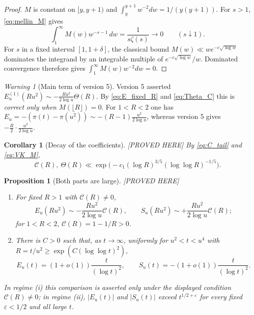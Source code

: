 \documentclass[11pt]{amsart}
\numberwithin{equation}{section}
\theoremstyle{plain}
\newtheorem{proposition}[theorem]{Proposition}
\newtheorem{corollary}[theorem]{Corollary}
\theoremstyle{definition}
\theoremstyle{remark}
\newtheorem{warning}[theorem]{Warning}
\newcommand{\eps}{\varepsilon}
\newcommand{\Cc}{\mathcal{C}}
\begin{document}
\begin{proof}
$M$ is constant on $[y,y+1)$ and $\int_y^{y+1}w^{-2}dw=1/(y(y+1))$. For $s>1$, \eqref{eq:mellin_M} gives
\[
\int_1^\infty M(w)w^{-s-1}\,dw=\frac1{s\zeta(s)}\longrightarrow0
\qquad(s\downarrow1).
\]
For $s$ in a fixed interval $[1,1+\delta]$, the classical bound
$M(w)\ll we^{-c\sqrt{\log w}}$ dominates the integrand by an integrable
multiple of $e^{-c\sqrt{\log w}}/w$.  Dominated convergence therefore gives
$\int_1^\infty M(w)w^{-2}dw=0$.
\end{proof}

\begin{warning}[Main term of version 5]
\label{warn:v5_main_term}
Version 5 asserted $E_u^{(1)}(Ru^2)\sim-\frac{Ru^2}{2\log u}\Theta(R)$. By
\eqref{eq:E_fixed_R} and \eqref{eq:Theta_C} this is \emph{correct only when
$M(\lfloor R\rfloor)=0$}. For $1<R<2$ one has
$E_u=-(\pi(t)-\pi(u^2))\sim-(R-1)\frac{u^2}{2\log u}$, whereas version 5
gives $-\frac R2\cdot\frac{u^2}{2\log u}$.
\end{warning}

\begin{corollary}[Decay of the coefficients]
\label{cor:AR-VK}
\emph{[PROVED HERE]} By \eqref{eq:C_tail} and \eqref{eq:VK_M},
\begin{equation}
\label{eq:AR-VK}
  \Cc(R),\ \Theta(R)\ll\exp\bigl(-c_1(\log R)^{3/5}(\log\log R)^{-1/5}\bigr).
\end{equation}
\end{corollary}

\begin{proposition}[Both parts are large]
\label{prop:both_parts_large}
\emph{[PROVED HERE]}
\begin{enumerate}[label=\textup{(\roman*)}]
\item For fixed $R>1$ with $\Cc(R)\ne0$,
\begin{equation}
\label{eq:E_fixed_R_size}
  E_u(Ru^2)\sim-\frac{Ru^2}{2\log u}\Cc(R),\qquad
  S_u(Ru^2)\sim+\frac{Ru^2}{2\log u}\Cc(R);
\end{equation}
for $1<R<2$, $\Cc(R)=1-1/R>0$.
\item There is $C>0$ such that, as $t\to\infty$, uniformly for $u^2<t<u^4$
with $R=t/u^2\ge\exp(C(\log\log t)^2)$,
\begin{equation}
\label{eq:E_log2}
  E_u(t)=(1+o(1))\frac{t}{(\log t)^2},\qquad
  S_u(t)=-(1+o(1))\frac{t}{(\log t)^2}.
\end{equation}
\end{enumerate}
In regime (i) this comparison is asserted only under the displayed condition
$\Cc(R)\ne0$; in regime (ii), $|E_u(t)|$ and $|S_u(t)|$ exceed
$t^{1/2+\eps}$ for every fixed $\eps<1/2$ and all large $t$.
\end{proposition}
\end{document}
